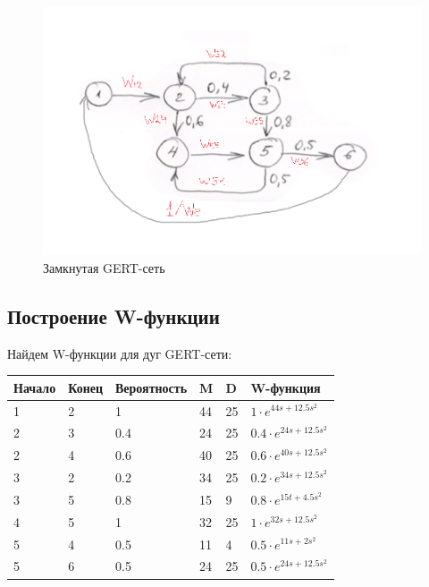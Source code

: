 \documentclass[14pt,a4paper,report]{report}
\begin{document}
\begin{figure}[h!]
	\centering
	\includegraphics[scale = 0.65]{images/1.png}
	\caption{Замкнутая GERT-сеть}
	\label{image:1}
\end{figure}

\subsection{Построение W-функции}

Найдем W-функции для дуг GERT-сети:

\begin{table}[h!]
	\bgroup
	\def\arraystretch{1}
	\begin{tabular}{ | m{1.5cm} | m{1.5cm} | m{2.0cm} | m{1.0cm} | m{1.0cm} | m{3.0cm} | }
		\hline
		Начало & Конец & Вероятность & M & D & W-функция \\ \hline
		1 &  2 & 1 		& 44 & 25 & $1\cdot e^{44s+12.5s^2}$ \\ \hline
		2 & 3 & 0.4  & 24 & 25 & $0.4\cdot e^{24s+12.5s^2}$ \\ \hline
		2 & 4 & 0.6 	& 40 & 25 & $0.6\cdot e^{40s+12.5s^2}$ \\ \hline
		3 & 2 & 0.2 	& 34 & 25 & $0.2\cdot e^{34s+12.5s^2}$ \\ \hline
		3 & 5 & 0.8 	& 15 & 9 & $0.8\cdot e^{15t+4.5s^2}$ \\ \hline
		4 & 5 & 1 		& 32 & 25 & $1\cdot e^{32s+12.5s^2}$ \\ \hline
		5 & 4 & 0.5 	& 11 & 4 & $0.5\cdot e^{11s+2s^2}$ \\ \hline
		5 & 6 & 0.5 	& 24 & 25 & $0.5\cdot e^{24s+12.5s^2}$ \\ \hline
	\end{tabular}
	\egroup
\end{table}
\end{document}
